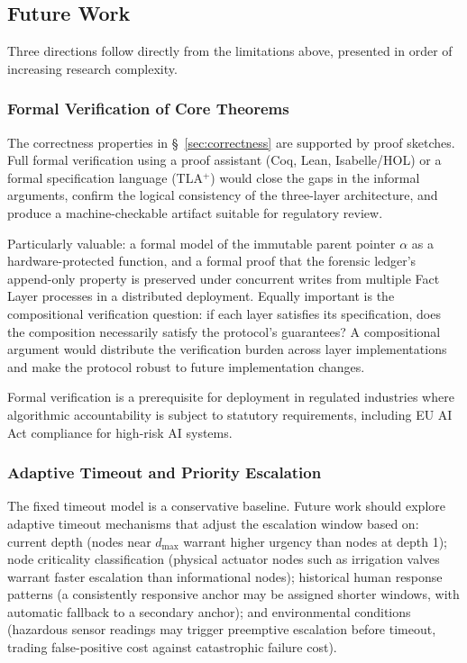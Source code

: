 \subsection{Future Work}
\label{sec:future-work}

Three directions follow directly from the limitations above, presented in order of increasing research complexity.

\subsubsection{Formal Verification of Core Theorems}
\label{sec:future-formal-verification}

The correctness properties in \S~\ref{sec:correctness} are supported by proof sketches. Full formal verification using a proof assistant (Coq, Lean, Isabelle/HOL) or a formal specification language (TLA$^+$) would close the gaps in the informal arguments, confirm the logical consistency of the three-layer architecture, and produce a machine-checkable artifact suitable for regulatory review.

Particularly valuable: a formal model of the immutable parent pointer $\alpha$ as a hardware-protected function, and a formal proof that the forensic ledger's append-only property is preserved under concurrent writes from multiple Fact Layer processes in a distributed deployment. Equally important is the compositional verification question: if each layer satisfies its specification, does the composition necessarily satisfy the protocol's guarantees? A compositional argument would distribute the verification burden across layer implementations and make the protocol robust to future implementation changes.

Formal verification is a prerequisite for deployment in regulated industries where algorithmic accountability is subject to statutory requirements, including EU AI Act compliance for high-risk AI systems.

\subsubsection{Adaptive Timeout and Priority Escalation}
\label{sec:future-adaptive-timeout}

The fixed timeout model is a conservative baseline. Future work should explore adaptive timeout mechanisms that adjust the escalation window based on: current depth (nodes near $d_{\max}$ warrant higher urgency than nodes at depth 1); node criticality classification (physical actuator nodes such as irrigation valves warrant faster escalation than informational nodes); historical human response patterns (a consistently responsive anchor may be assigned shorter windows, with automatic fallback to a secondary anchor); and environmental conditions (hazardous sensor readings may trigger preemptive escalation before timeout, trading false-positive cost against catastrophic failure cost).

